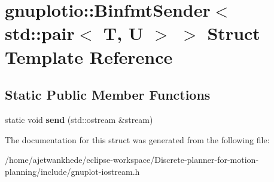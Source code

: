 \hypertarget{structgnuplotio_1_1BinfmtSender_3_01std_1_1pair_3_01T_00_01U_01_4_01_4}{}\section{gnuplotio\+:\+:Binfmt\+Sender$<$ std\+:\+:pair$<$ T, U $>$ $>$ Struct Template Reference}
\label{structgnuplotio_1_1BinfmtSender_3_01std_1_1pair_3_01T_00_01U_01_4_01_4}
\subsection*{Static Public Member Functions}
\begin{DoxyCompactItemize}
\item 
\mbox{\label{structgnuplotio_1_1BinfmtSender_3_01std_1_1pair_3_01T_00_01U_01_4_01_4_a08b2bedbc54824cd202c664116e37243}} 
static void {\bfseries send} (std\+::ostream \&stream)
\end{DoxyCompactItemize}


The documentation for this struct was generated from the following file\+:\begin{DoxyCompactItemize}
\item 
/home/ajetwankhede/eclipse-\/workspace/\+Discrete-\/planner-\/for-\/motion-\/planning/include/gnuplot-\/iostream.\+h\end{DoxyCompactItemize}

